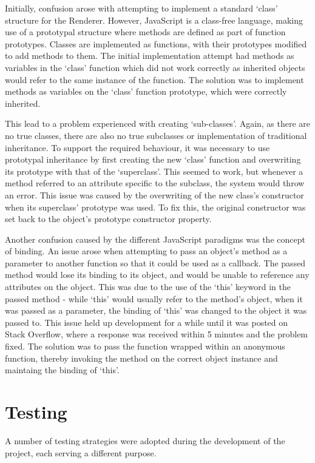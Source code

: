 \documentclass[a4papert,11pt,notitlepage]{article}
\begin{document}
Initially, confusion arose with attempting to implement a standard `class' structure for the Renderer. However, JavaScript is a class-free language, making use of a prototypal structure where methods are defined as part of function prototypes. Classes are implemented as functions, with their prototypes modified to add methods to them. The initial implementation attempt had methods as variables in the `class' function which did not work correctly as inherited objects would refer to the same instance of the function. The solution was to implement methods as variables on the `class' function prototype, which were correctly inherited.

This lead to a problem experienced with creating `sub-classes'. Again, as there are no true classes, there are also no true subclasses or implementation of traditional inheritance. To support the required behaviour, it was necessary to use prototypal inheritance by first creating the new `class' function and overwriting its prototype with that of the `superclass'. This seemed to work, but whenever a method referred to an attribute specific to the subclass, the system would throw an error. This issue was caused by the overwriting of the new class's constructor when its superclass' prototype was used. To fix this, the original constructor was set back to the object's prototype constructor property.

Another confusion caused by the different JavaScript paradigms was the concept of binding. An issue arose when attempting to pass an object's method as a parameter to another function so that it could be used as a callback. The passed method would lose its binding to its object, and would be unable to reference any attributes on the object. This was due to the use of the `this' keyword in the passed method - while `this' would usually refer to the method's object, when it was passed as a parameter, the binding of `this' was changed to the object it was passed to. This issue held up development for a while until it was posted on Stack Overflow\cite{persistentfunction:web}, where a response was received within 5 minutes and the problem fixed. The solution was to pass the function wrapped within an anonymous function, thereby invoking the method on the correct object instance and maintaing the binding of `this'.

\pagebreak
\section{Testing}
\label{sec:testing}
A number of testing strategies were adopted during the development of the project, each serving a different purpose.
\end{document}
